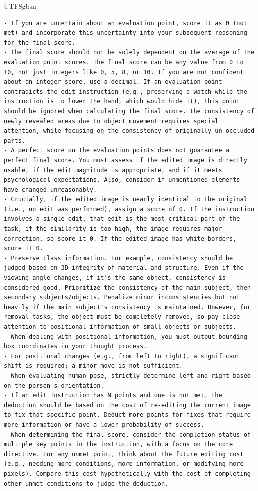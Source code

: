 \documentclass{llmxive}
\begin{document}
\begin{CJK*}{UTF8}{gbsn}
\begin{lstlisting}
- If you are uncertain about an evaluation point, score it as 0 (not met) and incorporate this uncertainty into your subsequent reasoning for the final score.
- The final score should not be solely dependent on the average of the evaluation point scores. The final score can be any value from 0 to 10, not just integers like 0, 5, 8, or 10. If you are not confident about an integer score, use a decimal. If an evaluation point contradicts the edit instruction (e.g., preserving a watch while the instruction is to lower the hand, which would hide it), this point should be ignored when calculating the final score. The consistency of newly revealed areas due to object movement requires special attention, while focusing on the consistency of originally un-occluded parts.
- A perfect score on the evaluation points does not guarantee a perfect final score. You must assess if the edited image is directly usable, if the edit magnitude is appropriate, and if it meets psychological expectations. Also, consider if unmentioned elements have changed unreasonably.
- Crucially, if the edited image is nearly identical to the original (i.e., no edit was performed), assign a score of 0. If the instruction involves a single edit, that edit is the most critical part of the task; if the similarity is too high, the image requires major correction, so score it 0. If the edited image has white borders, score it 0.
- Preserve class information. For example, consistency should be judged based on 3D integrity of material and structure. Even if the viewing angle changes, if it's the same object, consistency is considered good. Prioritize the consistency of the main subject, then secondary subjects/objects. Penalize minor inconsistencies but not heavily if the main subject's consistency is maintained. However, for removal tasks, the object must be completely removed, so pay close attention to positional information of small objects or subjects.
- When dealing with positional information, you must output bounding box coordinates in your thought process.
- For positional changes (e.g., from left to right), a significant shift is required; a minor move is not sufficient.
- When evaluating human pose, strictly determine left and right based on the person's orientation.
- If an edit instruction has N points and one is not met, the deduction should be based on the cost of re-editing the current image to fix that specific point. Deduct more points for fixes that require more information or have a lower probability of success.
- When determining the final score, consider the completion status of multiple key points in the instruction, with a focus on the core directive. For any unmet point, think about the future editing cost (e.g., needing more conditions, more information, or modifying more pixels). Compare this cost hypothetically with the cost of completing other unmet conditions to judge the deduction.

\end{lstlisting}
\end{CJK*}
\end{document}
